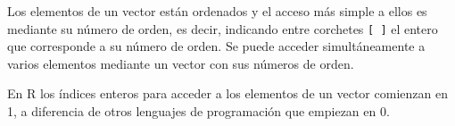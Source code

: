 \documentclass[
  a4paper,
]{scrreport}
\theoremstyle{definition}
\theoremstyle{definition}
\theoremstyle{remark}
\begin{document}
Los elementos de un vector están ordenados y el acceso más simple a
ellos es mediante su número de orden, es decir, indicando entre
corchetes \texttt{{[}\ {]}} el entero que corresponde a su número de
orden. Se puede acceder simultáneamente a varios elementos mediante un
vector con sus números de orden.

\begin{tcolorbox}[enhanced jigsaw, title=\textcolor{quarto-callout-warning-color}{\faExclamationTriangle}\hspace{0.5em}{Advertencia}, titlerule=0mm, toprule=.15mm, colbacktitle=quarto-callout-warning-color!10!white, arc=.35mm, colframe=quarto-callout-warning-color-frame, opacitybacktitle=0.6, coltitle=black, left=2mm, colback=white, opacityback=0, breakable, bottomrule=.15mm, toptitle=1mm, leftrule=.75mm, bottomtitle=1mm, rightrule=.15mm]

En R los índices enteros para acceder a los elementos de un vector
comienzan en 1, a diferencia de otros lenguajes de programación que
empiezan en 0.

\end{tcolorbox}
\end{document}
